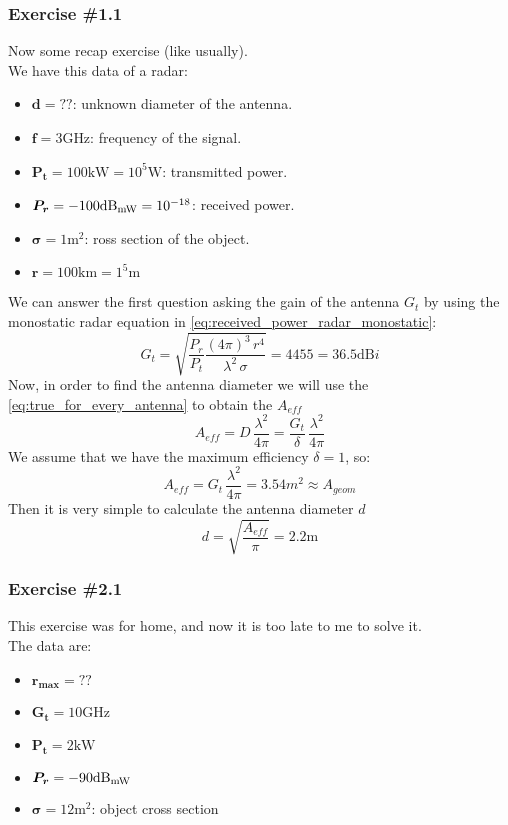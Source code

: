 \subsubsection*{Exercise \#1.1}
Now some recap exercise (like usually).\\
We have this data of a radar:
\begin{itemize}
    \item $\bm{d}=??$: unknown diameter of the antenna.
    \item $\bm{f}=3\si{\giga \hertz}$: frequency of the signal.
    \item $\bm{P_t}=100\si{\kilo\watt}=10^5\si{\watt}$: transmitted power.
    \item $\bm{P_r}=-100\si{\deci\bel_{\milli\watt}}=10^{-18}$: received power.
    \item $\bm{\sigma}=1\si{\metre^2}$: ross section of the object.
    \item $\bm{r}=100\si{\kilo\metre}=1^5\si{\metre}$
\end{itemize}
We can answer the first question asking the gain of the antenna $G_t$ by using the monostatic radar equation in \cref{eq:received_power_radar_monostatic}:
\begin{equation*}
    G_t=\sqrt{\frac{P_r}{P_t}\frac{(4\pi)^3\,r^4}{\lambda^2\,\sigma}}=4455=36.5\si{\deci\bel i}
\end{equation*}
Now, in order to find the antenna diameter we will use the \cref{eq:true_for_every_antenna} to obtain the $A_{eff}$
\begin{equation*}
    A_{eff}=D\,\frac{\lambda^2}{4\pi}=\frac{G_t}{\delta}\,\frac{\lambda^2}{4\pi}
\end{equation*}
We assume that we have the maximum efficiency $\delta=1$, so:
\begin{equation*}
    A_{eff}=G_t\,\frac{\lambda^2}{4\pi}=3.54\si{m^2}\approx A_{geom}
\end{equation*}
Then it is very simple to calculate the antenna diameter $d$
\begin{equation*}
    d=\sqrt{\frac{A_{eff}}{\pi}}=2.2\si{\metre}
\end{equation*}
\subsubsection*{Exercise \#2.1}
This exercise was for home, and now it is too late to me to solve it.\\
The data are:
\begin{itemize}
    \item $\bm{r_{max}}=??$
    \item $\bm{G_t}=10\si{\giga\hertz}$
    \item $\bm{P_t}=2\si{\kilo\watt}$
    \item $\bm{P_r}=-90\si{\deci \bel_{\milli\watt}}$
    \item $\bm{\sigma}=12\si{\metre^2}$: object cross section
\end{itemize}
